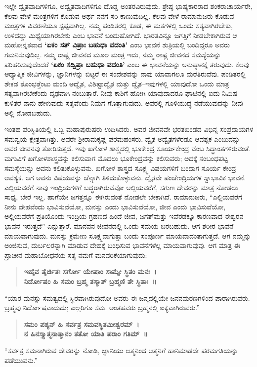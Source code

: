 ಇಲ್ಲೇ ದ್ವೈತವಾದಿಗಳಿಗೂ, ಅದ್ವೈತವಾದಿಗಳಿಗೂ ದೊಡ್ಡ ಅಂತರವಿರುವುದು. ಶ್ರೇಷ್ಠ ಭಾಷ್ಯಕಾರರಾದ ಶಂಕರಾಚಾರ್ಯರೇ, ಕೆಲವು ವೇಳೆ ಮಂತ್ರಗಳಿಗೆ ಕೊಡುವ ಅರ್ಥ ನನಗೆ ಸರಿ ಕಾಣುವುದಿಲ್ಲ. ಕೆಲವು ವೇಳೆ ರಾಮಾನುಜರು ಕೊಡುವ ಮಂತ್ರಗಳ ವಿವರಣೆಯೂ ಸ್ಪಷ್ಟವಾಗಿಲ್ಲ. ನಮ್ಮ ಪಂಡಿತರಲ್ಲಿ ಕೂಡ, ಈ ಮತಗಳಲ್ಲಿ ಒಂದು ಸತ್ಯವಾಗಿರಬೇಕು, ಉಳಿದದ್ದು ಮಿಥ್ಯೆಯಾಗಿರಬೇಕು ಎಂಬ ಭಾವನೆ ಬಂದುಹೋಗಿದೆ. ಭಾರತವಿನ್ನೂ ಜಗತ್ತಿಗೆ ನೀಡಬೇಕಾಗಿರುವ ಆ ಮಹೋನ್ನತವಾದ \textbf{‘ಏಕಂ ಸತ್​ ವಿಪ್ರಾಃ ಬಹುಧಾ ವದಂತಿ’} ಎಂಬ ಭಾವನೆ ಶುತ್ರಿಯಲ್ಲಿ ಬಂದಿದ್ದರೂ ಅವರು ಗಮನಿಸುವುದಿಲ್ಲ. ನಮ್ಮ ರಾಷ್ಟ್ರ ಜೀವನದ ಮೂಲ ಮಂತ್ರ ಇದು, ನಮ್ಮ ರಾಷ್ಟ್ರ ಜೀವನದ ಸಮಸ್ಯೆಯನ್ನು ಪರಿಹರಿಸುವುದೆಂದರೆ \textbf{‘ಏಕಂ ಸದ್ವಿಪ್ರಾ ಬಹುಧಾ ವದಂತಿ’} ಎಂಬ ಈ ಭಾವನೆಯನ್ನು ಅನುಷ್ಠಾನಕ್ಕೆ ತರುವುದು. ಕೆಲವು ಆಧ್ಯಾತ್ಮಿಕ ಜೀವಿಗಳನ್ನು, ಜ್ಞಾನಿಗಳನ್ನು ಬಿಟ್ಟರೆ ಈ ಸಂದೇಶವನ್ನು ನಾವು ಯಾವಾಗಲೂ ಮರೆತಿರುವೆವು. ಪಂಡಿತರಲ್ಲಿ ಶೇಕಡ ತೊಂಭತ್ತೆಂಟು ಮಂದಿ ಅದ್ವೈತ, ವಿಶಿಷ್ಟಾದ್ವೈತ ಮತ್ತು ದ್ವೈತ–ಇವುಗಳಲ್ಲಿ ಯಾವುದೋ ಒಂದು ಮಾತ್ರ ಸತ್ಯವಾಗಿರಬೇಕೆಂದು ದೃಢವಾಗಿ ನಂಬುತ್ತಾರೆ. ನೀವು ಕಾಶಿಗೆ ಹೋಗಿ ಯಾವುದಾದರೂ ಘಾಟಿನಲ್ಲಿ ಐದು ನಿಮಿಷ ಕುಳಿತರೆ ನಾನು ಹೇಳುವುದು ಸತ್ಯವೆಂದು ನಿಮಗೆ ಗೊತ್ತಾಗುವುದು. ಅವರಲ್ಲಿ ಗೂಳಿಯುದ್ಧ ನಡೆಯುವುದನ್ನು ನೀವು ಅಲ್ಲಿ ನೋಡಬಹುದು.

ಇಂತಹ ಪರಿಸ್ಥಿತಿಯಲ್ಲಿ ಒಬ್ಬ ಮಹಾಪುರುಷರು ಉದಿಸಿದರು. ಅವರ ಜೀವನವೇ ಭರತಖಂಡದ ವಿಭಿನ್ನ ಸಂಪ್ರದಾಯಗಳ ಸಮನ್ವಯ ಕ್ಷೇತ್ರವಾಗಿತ್ತು. ಅವರೇ ಶ‍್ರೀರಾಮಕೃಷ್ಣ ಪರಮಹಂಸರು. ದ್ವೈತ ಅದ್ವೈತಗಳೆರಡೂ ಆವಶ್ಯಕ ಎಂಬುದನ್ನು ಅವರ ಜೀವನವು ತೋರಿಸುತ್ತದೆ. ಇವು ಖಗೋಳ ಶಾಸ್ತ್ರದಲ್ಲಿ ಭೂಕೇಂದ್ರ  ಸೂರ್ಯಕೇಂದ್ರ  ವೆಂಬ ಸಿದ್ಧಾಂತಗಳಿರುವಂತೆ. ಮಗುವಿಗೆ ಖಗೋಳಶಾಸ್ತ್ರವನ್ನು ಕಲಿಸುವಾಗ ಮೊದಲು ಭೂಕೇಂದ್ರವನ್ನು ಕಲಿಸುವರು; ಅದಕ್ಕೆ ಸಂಬಂಧಪಟ್ಟ ಸಮಸ್ಯೆಯನ್ನು ಅವನು ಕಲಿತುಕೊಳ್ಳುವನು. ಖಗೋಳ ಶಾಸ್ತ್ರದ ಸೂಕ್ಷ್ಮ ವಿಷಯಗಳಿಗೆ ಬಂದಾಗ ಸೂರ್ಯ ಕೇಂದ್ರ ಆವಶ್ಯಕ. ಆಗ ಅವನು ವಿಷಯವನ್ನು ಚೆನ್ನಾಗಿ ತಿಳಿದುಕೊಳ್ಳುವನು. ದ್ವೈತವೇ ಪಂಚೇಂದ್ರಿಯಗಳ ಸ್ವಾಭಾವಿಕ ಭಾವನೆ. ಎಲ್ಲಿಯವರೆಗೆ ನಾವು ಇಂದ್ರಿಯಗಳಿಗೆ ಬದ್ಧರಾಗಿರುವೆವೋ ಅಲ್ಲಿಯವರೆಗೆ, ಸಗುಣ ದೇವರನ್ನು ಮಾತ್ರ ನೋಡಲು ಸಾಧ್ಯ, ಬೇರೆ ಇಲ್ಲ. ಹಾಗೆಯೇ ಜಗತ್ತನ್ನೂ ಈಗಿರುವಂತೆ ನೋಡಲೇ ಬೇಕಾಗಿದೆ. ರಾಮಾನುಜರು, “ಎಲ್ಲಿಯವರೆಗೆ ನೀನು ದೇಹವೆಂದು ಭಾವಿಸುವೆಯೋ, ಮನಸ್ಸು ಎಂದು ಭಾವಿಸುವೆಯೋ, ಜೀವ ಎಂದು ಭಾವಿಸುವೆಯೋ, ಅಲ್ಲಿಯವರೆಗೆ ಪ್ರತಿಯೊಂದು ಇಂದ್ರಿಯ ಗ್ರಹಣದ ಹಿಂದೆ ಜೀವ, ಜಗತ್​ ಮತ್ತು ಇವೆರಡಕ್ಕೂ ಕಾರಣವಾದ ಈಶ್ವರನ ಭಾವನೆ ಇರುತ್ತದೆ” ಎನ್ನುತ್ತಾರೆ. ಮಾನವನ ಜೀವನದಲ್ಲಿ ಒಂದು ಸಮಯ ಬರಬಹುದು. ಆಗ ಶರೀರ ಭಾವನೆ ಮಾಯವಾಗುವುದು. ಮನಸ್ಸು ಕ್ರಮೇಣ ಸೂಕ್ಷ್ಮವಾಗುತ್ತಾ ಬಂದು ಸಂಪೂರ್ಣ ಮಾಯವಾದಂತಾಗುತ್ತದೆ. ಆಗ ನಮ್ಮನ್ನು ಅಂಜಿಸುವ, ದುರ್ಬಲರನ್ನಾಗಿ ಮಾಡುವ ದೇಹಕ್ಕೆ ಬಂಧಿಸುವ ಭಾವನೆಗಳೆಲ್ಲ ಮಾಯವಾಗುವುವು. ಆಗ ಮಾತ್ರ ಈ ಪ್ರಾಚೀನ ಮಹಾಬೋಧನೆಯ ಸತ್ಯ ನಮಗೆ ಮನವರಿಕೆಯಾಗುವುದು:

\begin{verse}
\textbf{ಇಹೈವ ತೈರ್ಜಿತಃ ಸರ್ಗೋ ಯೇಷಾಂ ಸಾಮ್ಯೇ ಸ್ಥಿತಂ ಮನಃ~।}\\\textbf{ನಿರ್ದೋಷಂ ಹಿ ಸಮಂ ಬ್ರಹ್ಮ ತಸ್ಮಾತ್​ ಬ್ರಹ್ಮಣಿ ತೇ ಸ್ಥಿತಾಃ~॥}
\end{verse}

“ಯಾರ ಮನಸ್ಸು ಸಮತ್ವದಲ್ಲಿ ಸ್ಥಿರವಾಗಿರುವುದೋ ಅವರು ಈ ಜನ್ಮದಲ್ಲಿಯೇ ಜನನಮರಣಗಳಿಂದ ಪಾರಾಗಿರುವರು. ಬ್ರಹ್ಮವು ನಿರ್ದೋಷವಾದುದು; ಎಲ್ಲರಿಗೂ ಸಮ. ಅಂತಹವರು ಬ್ರಹ್ಮನಲ್ಲಿ ಐಕ್ಯವಾಗಿರುವರು.”

\begin{verse}
\textbf{ಸಮಂ ಪಶ್ಯನ್​ ಹಿ ಸರ್ವತ್ರ ಸಮವಸ್ಥಿತಮೀಶ್ವರಮ್​~।}\\\textbf{ನ ಹಿನಸ್ತ್ಯಾತ್ಮನಾತ್ಮಾನಂ ತತೋ ಯಾತಿ ಪರಾಂ ಗತಿಮ್​~॥}
\end{verse}

“ಸರ್ವತ್ರ ಸಮನಾಗಿರುವ ದೇವರನ್ನು ನೋಡಿ, ಜ್ಞಾನಿಯು ಆತ್ಮನಿಂದ ಆತ್ಮನಿಗೆ ಹಾನಿಮಾಡದೇ ಪರಮಗತಿಯನ್ನು ಪಡೆಯುವನು.”

